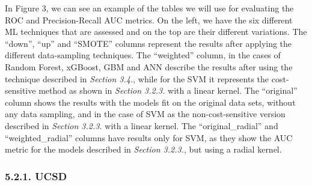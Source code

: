 \documentclass[12pt,]{article}
\begin{document}
\begin{table}

\caption{\label{tab:example_table_results}Example AUC result table}
\centering
{}
\end{table}

In Figure 3, we can see an example of the tables we will use for
evaluating the ROC and Precision-Recall AUC metrics. On the left, we
have the six different ML techniques that are assessed and on the top
are their different variations. The ``down'', ``up'' and ``SMOTE''
columns represent the results after applying the different data-sampling
techniques. The ``weighted'' column, in the cases of Random Forest,
xGBoost, GBM and ANN describe the results after using the technique
described in \emph{Section 3.4.}, while for the SVM it represents the
cost-sensitive method as shown in \emph{Section 3.2.3.} with a linear
kernel. The ``original'' column shows the results with the models fit on
the original data sets, without any data sampling, and in the case of
SVM as the non-cost-sensitive version described in \emph{Section 3.2.3.}
with a linear kernel. The ``original\_radial'' and ``weighted\_radial''
columns have results only for SVM, as they show the AUC metric for the
models described in \emph{Section 3.2.3.}, but using a radial kernel.

\hypertarget{ucsd}{%
\subsubsection{5.2.1. UCSD}\label{ucsd}}
\end{document}
